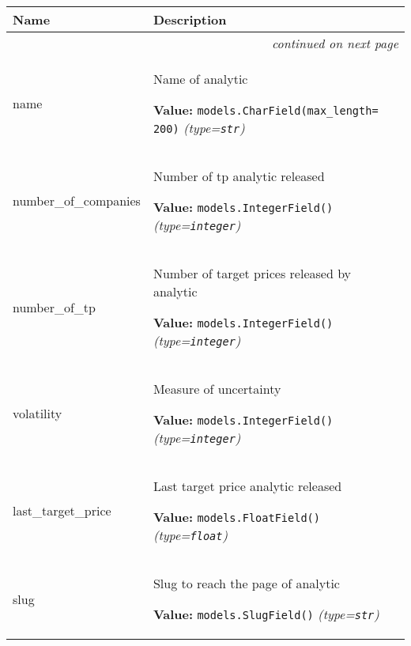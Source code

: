     \vspace{-1cm}
\hspace{\varindent}\begin{longtable}{|p{\varnamewidth}|p{\vardescrwidth}|l}
\cline{1-2}
\cline{1-2} \centering \textbf{Name} & \centering \textbf{Description}& \\
\cline{1-2}
\endhead\cline{1-2}\multicolumn{3}{r}{\small\textit{continued on next page}}\\\endfoot\cline{1-2}
\endlastfoot\raggedright n\-a\-m\-e\- & \raggedright Name of analytic

\textbf{Value:} 
{\tt models.CharField(max\_length= 200)}            {\it (type=\texttt{str})}&\\
\cline{1-2}
\raggedright n\-u\-m\-b\-e\-r\-\_\-o\-f\-\_\-c\-o\-m\-p\-a\-n\-i\-e\-s\- & \raggedright Number of tp analytic released

\textbf{Value:} 
{\tt models.IntegerField()}            {\it (type=\texttt{integer})}&\\
\cline{1-2}
\raggedright n\-u\-m\-b\-e\-r\-\_\-o\-f\-\_\-t\-p\- & \raggedright Number of target prices released by analytic

\textbf{Value:} 
{\tt models.IntegerField()}            {\it (type=\texttt{integer})}&\\
\cline{1-2}
\raggedright v\-o\-l\-a\-t\-i\-l\-i\-t\-y\- & \raggedright Measure of uncertainty

\textbf{Value:} 
{\tt models.IntegerField()}            {\it (type=\texttt{integer})}&\\
\cline{1-2}
\raggedright l\-a\-s\-t\-\_\-t\-a\-r\-g\-e\-t\-\_\-p\-r\-i\-c\-e\- & \raggedright Last target price analytic released

\textbf{Value:} 
{\tt models.FloatField()}            {\it (type=\texttt{float})}&\\
\cline{1-2}
\raggedright s\-l\-u\-g\- & \raggedright Slug to reach the page of analytic

\textbf{Value:} 
{\tt models.SlugField()}            {\it (type=\texttt{str})}&\\
\cline{1-2}
\end{longtable}



